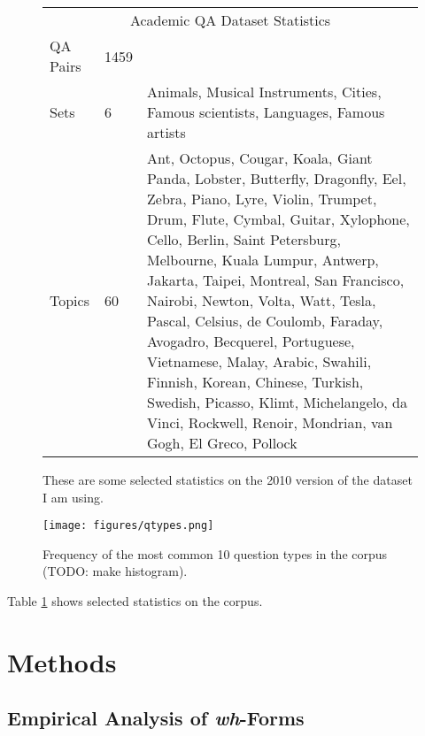 \documentclass[twoside]{article}
\begin{document}

\begin{figure}
\caption{These are some selected statistics on the 2010 version of the dataset I am using. \label{fig:datastat}}
\begin{tabular}{|l|l|p{11.5cm}|}
\hline
\multicolumn{3}{|c|}{Academic QA Dataset Statistics} \\
QA Pairs & 1459 & \\ \hline
Sets & 6 & {\color{applegreen}Animals}, {\color{azure}Musical Instruments}, {\color{auburn}Cities}, {\color{americanrose}Famous scientists}, {\color{orange}Languages}, {\color{black}Famous artists}\\ \hline
Topics & 60 & {\color{applegreen}Ant, Octopus, Cougar, Koala, Giant Panda, Lobster, Butterfly, Dragonfly, Eel, Zebra}, {\color{azure}Piano, Lyre, Violin, Trumpet, Drum, Flute, Cymbal, Guitar, Xylophone, Cello,} {\color{auburn}Berlin, Saint Petersburg, Melbourne, Kuala Lumpur, Antwerp, Jakarta, Taipei, Montreal, San Francisco, Nairobi,} {\color{americanrose}Newton, Volta, Watt, Tesla, Pascal, Celsius, de Coulomb, Faraday,  Avogadro, Becquerel}, {\color{orange}Portuguese, Vietnamese, Malay, Arabic, Swahili, Finnish, Korean, Chinese, Turkish, Swedish,} {\color{black}Picasso, Klimt, Michelangelo, da Vinci, Rockwell, Renoir, Mondrian, van Gogh, El Greco, Pollock} \\ \hline
\end{tabular}
\end{figure}

\begin{figure}
\centering
\caption{Frequency of the most common 10 question types in the corpus (TODO: make histogram). \label{fig:qtypes}}
\texttt{[image: figures/qtypes.png]}
\end{figure}

Table \ref{fig:datastat} shows selected statistics on the corpus.

\section{Methods}

\subsection{Empirical Analysis of \textit{wh}-Forms}
\end{document}
